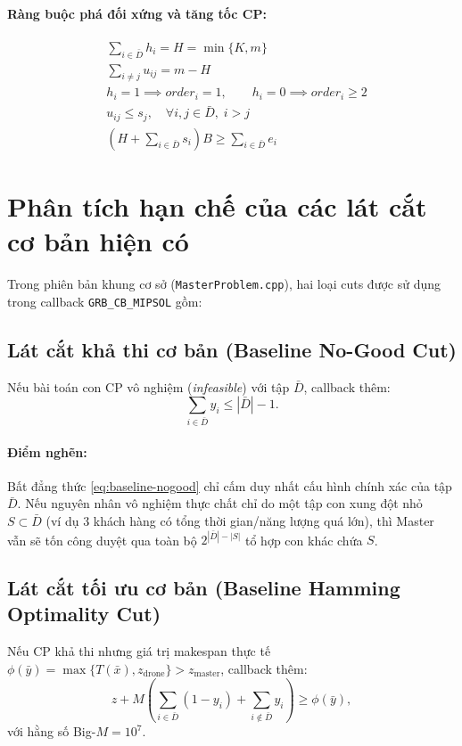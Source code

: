 \documentclass[12pt,a4paper]{article}
\begin{document}
\paragraph{Ràng buộc phá đối xứng và tăng tốc CP:}
\begin{align}
    & \sum_{i \in \bar{D}} h_i = H = \min\{K, m\} \label{eq:cp-tight-heads}\\
    & \sum_{i \neq j} u_{ij} = m - H \label{eq:cp-tight-arcs}\\
    & h_i = 1 \implies order_i = 1, \qquad h_i = 0 \implies order_i \ge 2 \label{eq:cp-order-tight}\\
    & u_{ij} \le s_j, \quad \forall i, j \in \bar{D}, \; i > j \label{eq:cp-symm-order}\\
    & (H + \sum_{i \in \bar{D}} s_i) B \ge \sum_{i \in \bar{D}} e_i \label{eq:cp-agg-energy}
\end{align}

\section{Phân tích hạn chế của các lát cắt cơ bản hiện có}
\label{sec:baseline-cuts-limitation}

Trong phiên bản khung cơ sở (\texttt{MasterProblem.cpp}), hai loại cuts được sử dụng trong callback \texttt{GRB\_CB\_MIPSOL} gồm:

\subsection{Lát cắt khả thi cơ bản (Baseline No-Good Cut)}
Nếu bài toán con CP vô nghiệm (\emph{infeasible}) với tập $\bar{D}$, callback thêm:
\begin{equation}
    \sum_{i \in \bar{D}} y_i \le |\bar{D}| - 1.
    \label{eq:baseline-nogood}
\end{equation}
\paragraph{Điểm nghẽn:} Bất đẳng thức \eqref{eq:baseline-nogood} chỉ cấm duy nhất cấu hình chính xác của tập $\bar{D}$. Nếu nguyên nhân vô nghiệm thực chất chỉ do một tập con xung đột nhỏ $S \subset \bar{D}$ (ví dụ 3 khách hàng có tổng thời gian/năng lượng quá lớn), thì Master vẫn sẽ tốn công duyệt qua toàn bộ $2^{|\bar{D}| - |S|}$ tổ hợp con khác chứa $S$.

\subsection{Lát cắt tối ưu cơ bản (Baseline Hamming Optimality Cut)}
Nếu CP khả thi nhưng giá trị makespan thực tế $\phi(\bar{y}) = \max\{T(\bar{x}), z_{\mathrm{drone}}\} > z_{\mathrm{master}}$, callback thêm:
\begin{equation}
    z + M \left(\sum_{i \in \bar{D}} (1 - y_i) + \sum_{i \notin \bar{D}} y_i\right) \ge \phi(\bar{y}),
    \label{eq:baseline-optimality}
\end{equation}
với hằng số Big-$M = 10^7$.
\end{document}
